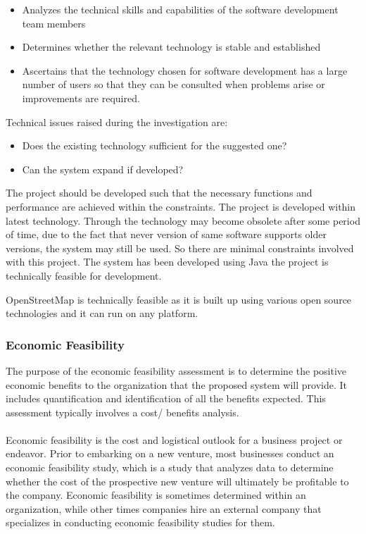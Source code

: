\begin{itemize}
	\item Analyzes the technical skills and capabilities of the software development team members
	\item Determines whether the relevant technology is stable and established
	\item Ascertains that the technology chosen for software development has a large number of users so that they can be consulted when problems arise or improvements are required.
\end{itemize}

Technical issues raised during the investigation are:
\begin{itemize}
	\item Does the existing technology sufficient for the suggested one?
	\item Can the system expand if developed?
\end{itemize}

The project should be developed such that the necessary functions and performance are achieved within the constraints. The project is developed within latest technology. Through the technology may become obsolete after some period of time, due to the fact that never version of same software supports older versions, the system may still be used. So there are minimal constraints involved with this project. The system has been developed using Java the project is technically feasible for development.

OpenStreetMap is technically feasible as it is built up using various open source technologies and it can run on any platform.

\subsubsection{Economic Feasibility}
The purpose of the economic feasibility assessment is to determine the positive economic benefits to the organization that the proposed system will provide. It includes quantification and identification of all the benefits expected. This assessment typically involves a cost/ benefits analysis.\\\\

Economic feasibility is the cost and logistical outlook for a business project or endeavor. Prior to embarking on a new venture, most businesses conduct an economic feasibility study, which is a study that analyzes data to determine whether the cost of the prospective new venture will ultimately be profitable to the company. Economic feasibility is sometimes determined within an organization, while other times companies hire an external company that specializes in conducting economic feasibility studies for them.\\\\

